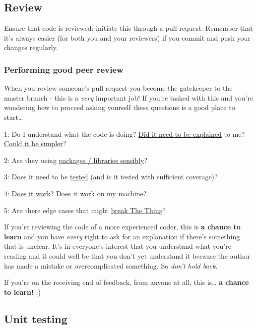 \documentclass[]{book}
\begin{document}
\hypertarget{review}{%
\subsection{Review}\label{review}}

Ensure that code is reviewed: initiate this through a pull request. Remember that it's always easier (for both you and your reviewers) if you commit and push your changes regularly.

\hypertarget{performing-good-peer-review}{%
\subsubsection*{Performing good peer review}\label{performing-good-peer-review}}

When you review someone's pull request you become the gatekeeper to the master branch - this is a \emph{very} important job! If you're tasked with this and you're wondering how to proceed asking yourself these questions is a good place to start\ldots{}

1: Do I understand what the code is doing? \protect\hyperlink{users}{Did it need to be explained} to me? \protect\hyperlink{ccc}{Could it be simpler}?

2: Are they using \protect\hyperlink{defaults}{packages / libraries sensibly}?

3: Does it need to be \protect\hyperlink{ccc}{tested} (and is it tested with sufficient coverage)?

4: \protect\hyperlink{ccc}{Does it work}? Does it work on my machine?

5: Are there edge cases that might \protect\hyperlink{errors}{break The Thing}?

If you're reviewing the code of a more experienced coder, this is \textbf{a chance to learn} and you have \emph{every} right to ask for an explanation if there's something that is unclear. It's in everyone's interest that you understand what you're reading and it could well be that you don't yet understand it because the author has made a mistake or overcomplicated something. So \emph{don't hold back}.

If you're on the receiving end of feedback, from anyone at all, this is\ldots{} \textbf{a chance to learn!} :)

\hypertarget{unittest}{%
\subsection{Unit testing}\label{unittest}}
\end{document}
